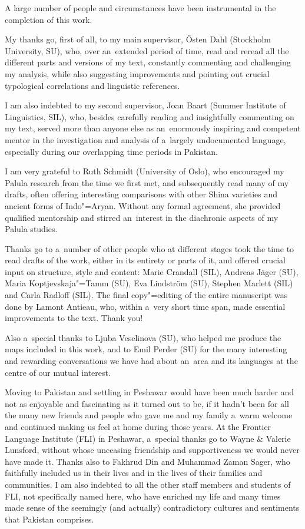 \begin{refsection}


A large number of people and circumstances have been instrumental in the completion of this work.


My thanks go, first of all, to my main supervisor, Östen Dahl (Stockholm University, SU), who, over
an~extended period of time, read and reread all the different parts and versions of my text,
constantly commenting and challenging my analysis, while also suggesting improvements and pointing
out crucial typological correlations and linguistic references.


I am also indebted to my second supervisor, Joan Baart (Summer Institute of Linguistics, SIL), who,
besides carefully reading and insightfully commenting on my text, served more than anyone else as
an~enormously inspiring and competent mentor in the investigation and analysis of a~largely
undocumented language, especially during our overlapping time periods in Pakistan.


I am very grateful to Ruth Schmidt (University of Oslo), who encouraged my Palula research from the
time we first met, and subsequently read many of my drafts, often offering interesting comparisons
with other Shina varieties and ancient forms of Indo"=Aryan. Without any formal agreement, she
provided qualified mentorship and stirred an~interest in the diachronic aspects of my Palula
studies.


Thanks go to a~number of other people who at different stages took the time to read drafts of the
work, either in its entirety or parts of it, and offered crucial input on structure, style and
content: Marie Crandall (SIL), Andreas Jäger (SU), Maria Koptjevskaja"=Tamm (SU), Eva Lindström (SU),
Stephen Marlett (SIL) and Carla Radloff (SIL). The final copy"=editing of the entire manuscript was
done by Lamont Antieau, who, within a~very short time span, made essential improvements to the
text. Thank you!


Also a~special thanks to Ljuba Veselinova (SU), who helped me produce the maps included in this
work, and to Emil Perder (SU) for the many interesting and rewarding conversations we have had about
an~area and its languages at the centre of our mutual interest.


Moving to Pakistan and settling in Peshawar would have been much harder and not as enjoyable and
fascinating as it turned out to be, if it hadn't been for all the many new friends and people who
gave me and my family a~warm welcome and continued making us feel at home during those years. At the
Frontier Language Institute (FLI) in Peshawar, a~special thanks go to Wayne \& Valerie Lunsford,
without whose unceasing friendship and supportiveness we would never have made it. Thanks also to
Fakhrud Din and Muhammad Zaman Sager, who faithfully included us in their lives and in the lives of
their families and communities. I am also indebted to all the other staff members and students of
FLI, not specifically named here, who have enriched my life and many times made sense of the
seemingly (and actually) contradictory cultures and sentiments that Pakistan comprises.



\end{refsection}
